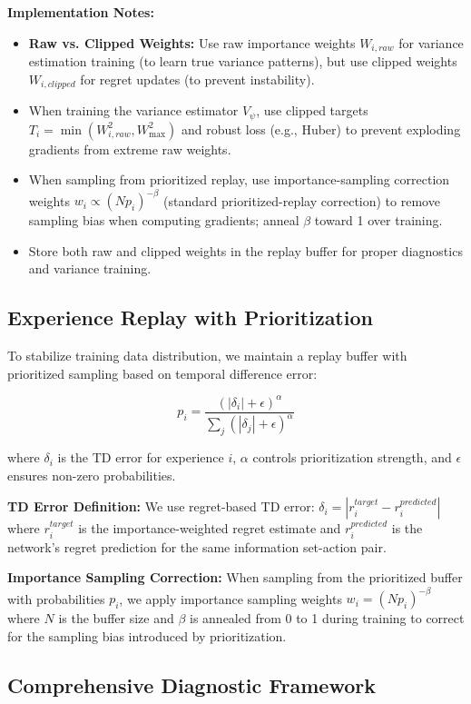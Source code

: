 \documentclass[12pt,a4paper]{article}
\begin{document}
\textbf{Implementation Notes:}
\begin{itemize}
\item \textbf{Raw vs. Clipped Weights:} Use raw importance weights $W_{i,raw}$ for variance estimation training (to learn true variance patterns), but use clipped weights $W_{i,clipped}$ for regret updates (to prevent instability).
\item When training the variance estimator $V_\psi$, use clipped targets $T_i = \min(W_{i,raw}^2, W_{\max}^2)$ and robust loss (e.g., Huber) to prevent exploding gradients from extreme raw weights.
\item When sampling from prioritized replay, use importance-sampling correction weights $w_i \propto (N p_i)^{-\beta}$ (standard prioritized-replay correction) to remove sampling bias when computing gradients; anneal $\beta$ toward 1 over training.
\item Store both raw and clipped weights in the replay buffer for proper diagnostics and variance training.
\end{itemize}

\subsection{Experience Replay with Prioritization}

To stabilize training data distribution, we maintain a replay buffer with prioritized sampling based on temporal difference error:

$$p_i = \frac{(|\delta_i| + \epsilon)^\alpha}{\sum_j (|\delta_j| + \epsilon)^\alpha}$$

where $\delta_i$ is the TD error for experience $i$, $\alpha$ controls prioritization strength, and $\epsilon$ ensures non-zero probabilities.

\textbf{TD Error Definition:} We use regret-based TD error: $\delta_i = |r_i^{target} - r_i^{predicted}|$ where $r_i^{target}$ is the importance-weighted regret estimate and $r_i^{predicted}$ is the network's regret prediction for the same information set-action pair.

\textbf{Importance Sampling Correction:} When sampling from the prioritized buffer with probabilities $p_i$, we apply importance sampling weights $w_i = (N p_i)^{-\beta}$ where $N$ is the buffer size and $\beta$ is annealed from 0 to 1 during training to correct for the sampling bias introduced by prioritization.

\subsection{Comprehensive Diagnostic Framework}
\end{document}
